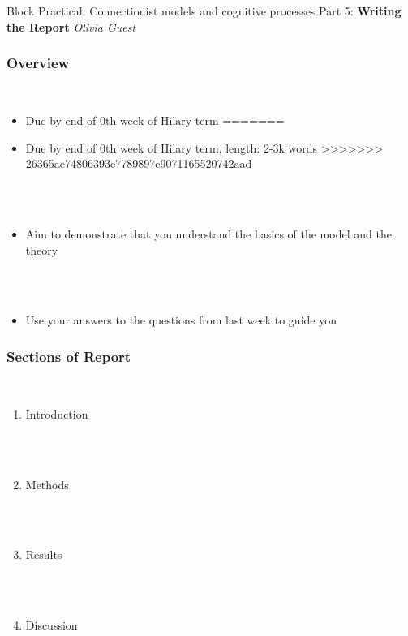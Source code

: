 \documentclass{beamer}
\begin{document}
\begin{frame}[fragile]

\centering\Huge Block Practical: Connectionist models and cognitive processes
\vfill \huge
\centering Part 5: \textbf{Writing the Report} \large
\vfill
\textit{
Olivia Guest }

\end{frame}


\begin{frame}[fragile]
\frametitle{Overview}
        \  \\

\begin{itemize}[<+->]
<<<<<<< HEAD
\item Due by end of 0th week of Hilary term
=======
\item Due by end of 0th week of Hilary term, length: 2-3k words
>>>>>>> 26365ae74806393e7789897e9071165520742aad

\ \\

\ \\

 \item Aim to demonstrate that you understand the basics of the model and the theory
 
\ \\

 \ \\
 
\item Use your answers to the questions from last week to guide you


\end{itemize}


\end{frame}


\begin{frame}[fragile]
\frametitle{Sections of Report}

        \  \\

\begin{enumerate}[<+->]
\item Introduction

\ \\

\ \\

\item Methods

\ \\

\ \\

\item Results

\ \\

\ \\

\item Discussion


\end{enumerate}


\end{frame}
\end{document}
